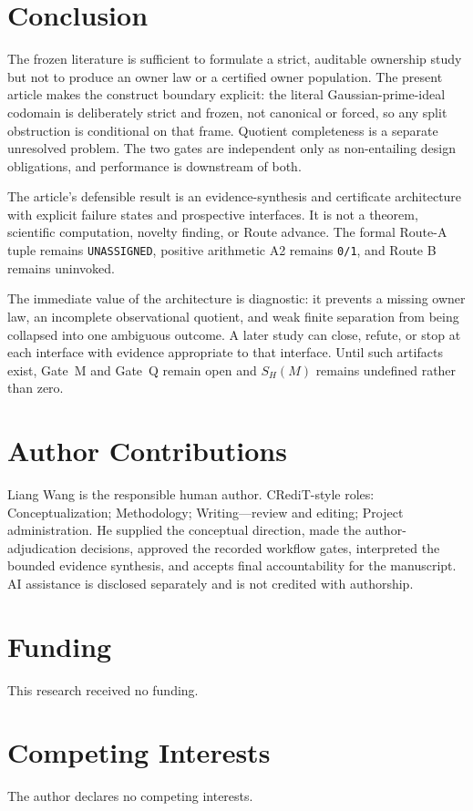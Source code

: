 \documentclass[11pt,a4paper]{article}
\begin{document}
\section{Conclusion}

The frozen literature is sufficient to formulate a strict, auditable ownership study but not to produce an owner law or a certified owner population. The present article makes the construct boundary explicit: the literal Gaussian-prime-ideal codomain is deliberately strict and frozen, not canonical or forced, so any split obstruction is conditional on that frame. Quotient completeness is a separate unresolved problem. The two gates are independent only as non-entailing design obligations, and performance is downstream of both.

The article's defensible result is an evidence-synthesis and certificate architecture with explicit failure states and prospective interfaces. It is not a theorem, scientific computation, novelty finding, or Route advance. The formal Route-A tuple remains \texttt{UNASSIGNED}, positive arithmetic A2 remains \texttt{0/1}, and Route B remains uninvoked.

The immediate value of the architecture is diagnostic: it prevents a missing owner law, an incomplete observational quotient, and weak finite separation from being collapsed into one ambiguous outcome. A later study can close, refute, or stop at each interface with evidence appropriate to that interface. Until such artifacts exist, Gate~M and Gate~Q remain open and \(S_H(M)\) remains undefined rather than zero.

\section*{Author Contributions}
Liang Wang is the responsible human author. CRediT-style roles: Conceptualization; Methodology; Writing---review and editing; Project administration. He supplied the conceptual direction, made the author-adjudication decisions, approved the recorded workflow gates, interpreted the bounded evidence synthesis, and accepts final accountability for the manuscript. AI assistance is disclosed separately and is not credited with authorship.

\section*{Funding}
This research received no funding.

\section*{Competing Interests}
The author declares no competing interests.
\end{document}
